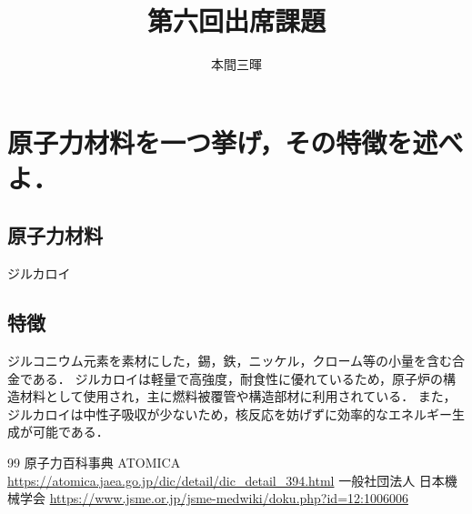 \documentclass[titlepage,a4paper]{jsarticle}
\title{第六回出席課題}
\author{本間三暉}
\begin{document}
\maketitle

\section{原子力材料を一つ挙げ，その特徴を述べよ．}
\subsection{原子力材料}
ジルカロイ
\subsection{特徴}
ジルコニウム元素を素材にした，錫，鉄，ニッケル，クローム等の小量を含む合金である．
ジルカロイは軽量で高強度，耐食性に優れているため，原子炉の構造材料として使用され，主に燃料被覆管や構造部材に利用されている．
また，ジルカロイは中性子吸収が少ないため，核反応を妨げずに効率的なエネルギー生成が可能である．

\begin{thebibliography}{99}
原子力百科事典 ATOMICA \url{https://atomica.jaea.go.jp/dic/detail/dic_detail_394.html}
一般社団法人 日本機械学会 \url{https://www.jsme.or.jp/jsme-medwiki/doku.php?id=12:1006006}

\end{thebibliography}
\end{document}
